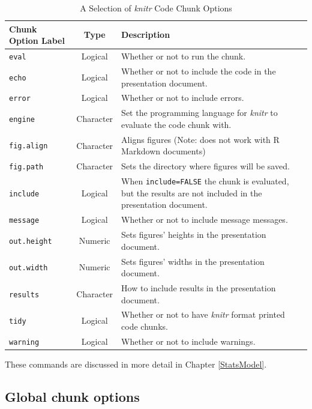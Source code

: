 \documentclass[krantz1]{krantz}
\begin{document}
\begin{table}
  \caption{A Selection of {\emph{knitr}} Code Chunk Options}
  \begin{center}
  \label{ChunkOptionsTable}
  \begin{tabular}{l c p{5cm}}
    \hline  
    Chunk Option Label & Type & Description \\[0.25cm] \hline\hline
    \texttt{eval} & Logical & Whether or not to run the chunk. \\[0.25cm]
    \texttt{echo} & Logical & Whether or not to include the code in the presentation document. \\[0.25cm]
    \texttt{error} & Logical & Whether or not to include errors. \\[0.25cm]
    \texttt{engine} & Character & Set the programming language for {\emph{knitr}} to evaluate the code chunk with. \\[0.25cm]
    \texttt{fig.align} & Character & Aligns figures (Note: does not work with R Markdown documents) \\[0.25cm]
    \texttt{fig.path} & Character & Sets the directory where figures will be saved. \\[0.25cm]
    \texttt{include} & Logical & When \texttt{include=FALSE} the chunk is evaluated, but the results are not included in the presentation document. \\[0.25cm]
    \texttt{message} & Logical & Whether or not to include message messages. \\[0.25cm]
    \texttt{out.height} & Numeric & Sets figures' heights in the presentation document. \\[0.25cm]
    \texttt{out.width} & Numeric & Sets figures' widths in the presentation document. \\[0.25cm]   
    \texttt{results} & Character & How to include results in the presentation document. \\[0.25cm]
    \texttt{tidy} & Logical & Whether or not to have \emph{knitr} format printed code chunks. \\[0.25cm]
    \texttt{warning} & Logical & Whether or not to include warnings. \\[0.25cm]
    \hline
  \end{tabular}
  \end{center}
  {\scriptsize{These commands are discussed in more detail in Chapter \ref{StatsModel}.}}
\end{table}

\subsection{Global chunk options}
\end{document}

